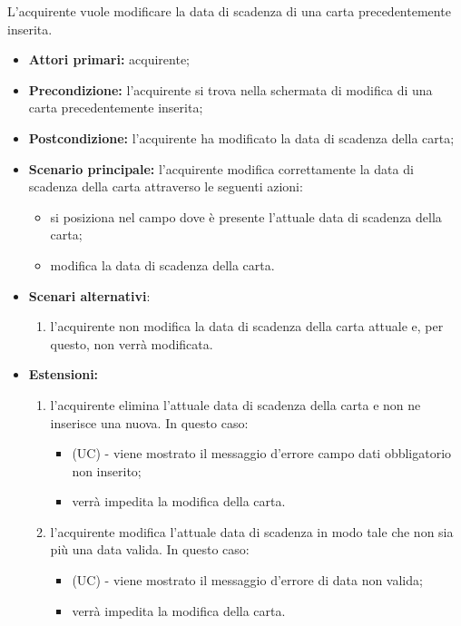 L'acquirente vuole modificare la data di scadenza di una carta precedentemente inserita.
\begin{itemize}
    \item \textbf{Attori primari:} acquirente;
    \item \textbf{Precondizione:} l'acquirente si trova nella schermata di modifica di una carta precedentemente inserita;
    \item \textbf{Postcondizione:} l'acquirente ha modificato la data di scadenza della carta;
    \item \textbf{Scenario principale:} l'acquirente modifica correttamente la data di scadenza della carta attraverso le seguenti azioni:
    \begin{itemize}
        \item si posiziona nel campo dove è presente l'attuale data di scadenza della carta;
        \item modifica la data di scadenza della carta.
    \end{itemize}
    \item \textbf{Scenari alternativi}:
    \begin{enumerate}[label=\lett]
        \item l'acquirente non modifica la data di scadenza della carta attuale e, per questo, non verrà modificata.
    \end{enumerate}
    \item \textbf{Estensioni:}
    \begin{enumerate}[label=\lett]
        \item l'acquirente elimina l'attuale data di scadenza della carta e non ne inserisce una nuova. In questo caso:
        \begin{itemize}
            \item (UC) - viene mostrato il messaggio d'errore campo dati obbligatorio non inserito;
            \item verrà impedita la modifica della carta.
        \end{itemize}
        \item l'acquirente modifica l'attuale data di scadenza in modo tale che non sia più una data valida. In questo caso:
        \begin{itemize}
            \item (UC) - viene mostrato il messaggio d'errore di data non valida;
            \item verrà impedita la modifica della carta.
        \end{itemize}
    \end{enumerate}
\end{itemize}

